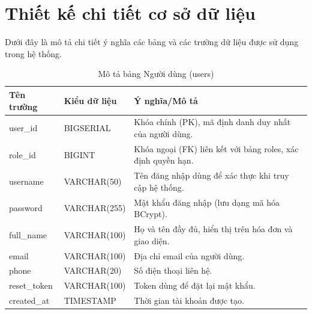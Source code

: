\documentclass[../20232006p.tex]{subfiles}
\begin{document}
\section{Thiết kế chi tiết cơ sở dữ liệu}
Dưới đây là mô tả chi tiết ý nghĩa các bảng và các trường dữ liệu được sử dụng trong hệ thống.

\begin{table}[H]
    \centering
    \caption{Mô tả bảng Người dùng (users)}
    \label{tab:users}
    \begin{tabular}{|p{3.5cm}|p{3cm}|p{7.5cm}|}
        \hline
        \textbf{Tên trường} & \textbf{Kiểu dữ liệu} & \textbf{Ý nghĩa/Mô tả}                                       \\
        \hline
        user\_id            & BIGSERIAL             & Khóa chính (PK), mã định danh duy nhất của người dùng.       \\
        \hline
        role\_id            & BIGINT                & Khóa ngoại (FK) liên kết với bảng roles, xác định quyền hạn. \\
        \hline
        username            & VARCHAR(50)           & Tên đăng nhập dùng để xác thực khi truy cập hệ thống.        \\
        \hline
        password            & VARCHAR(255)          & Mật khẩu đăng nhập (lưu dạng mã hóa BCrypt).                 \\
        \hline
        full\_name          & VARCHAR(100)          & Họ và tên đầy đủ, hiển thị trên hóa đơn và giao diện.        \\
        \hline
        email               & VARCHAR(100)          & Địa chỉ email của người dùng.                                \\
        \hline
        phone               & VARCHAR(20)           & Số điện thoại liên hệ.                                       \\
        \hline
        reset\_token        & VARCHAR(100)          & Token dùng để đặt lại mật khẩu.                              \\
        \hline
        created\_at         & TIMESTAMP             & Thời gian tài khoản được tạo.                                \\
        \hline
    \end{tabular}
\end{table}
\end{document}
